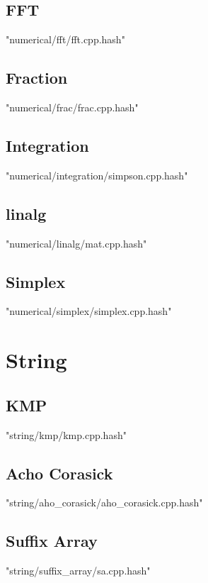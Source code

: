 \documentclass [12pt,onecolumn,oneside]{article}
\begin{document}
\subsection{ FFT}
 {"numerical/fft/fft.cpp.hash"}
\subsection{ Fraction}
 {"numerical/frac/frac.cpp.hash"}
\subsection{ Integration}
 {"numerical/integration/simpson.cpp.hash"}
\subsection{ linalg}
 {"numerical/linalg/mat.cpp.hash"}
\subsection{ Simplex}
 {"numerical/simplex/simplex.cpp.hash"}
\newpage

\section{String}
\subsection{ KMP}
 {"string/kmp/kmp.cpp.hash"}
\subsection{ Acho Corasick}
 {"string/aho_corasick/aho_corasick.cpp.hash"}
\subsection{ Suffix Array}
 {"string/suffix_array/sa.cpp.hash"}
\newpage
\end{document}
